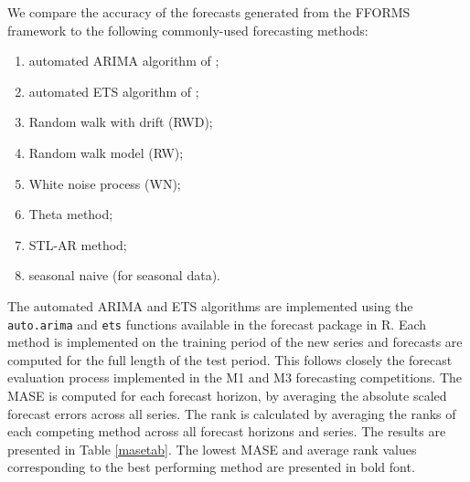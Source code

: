 \documentclass[11pt,a4paper,]{article}
\providecommand{\tightlist}{%
  \setlength{\itemsep}{0pt}\setlength{\parskip}{0pt}}
\theoremstyle{definition}
\theoremstyle{definition}
\theoremstyle{definition}
\theoremstyle{remark}
\begin{document}
We compare the accuracy of the forecasts generated from the FFORMS
framework to the following commonly-used forecasting methods:

\begin{enumerate}
\def\labelenumi{\arabic{enumi}.}
\tightlist
\item
  automated ARIMA algorithm of \textcite{Hyndman2008};
\item
  automated ETS algorithm of \textcite{Hyndman2008};
\item
  Random walk with drift (RWD);
\item
  Random walk model (RW);
\item
  White noise process (WN);
\item
  Theta method;
\item
  STL-AR method;
\item
  seasonal naive (for seasonal data).
\end{enumerate}

The automated ARIMA and ETS algorithms are implemented using the
\texttt{auto.arima} and \texttt{ets} functions available in the forecast
package in R. Each method is implemented on the training period of the
new series and forecasts are computed for the full length of the test
period. This follows closely the forecast evaluation process implemented
in the M1 and M3 forecasting competitions. The MASE is computed for each
forecast horizon, by averaging the absolute scaled forecast errors
across all series. The rank is calculated by averaging the ranks of each
competing method across all forecast horizons and series. The results
are presented in Table \ref{masetab}. The lowest MASE and average rank
values corresponding to the best performing method are presented in bold
font.
\end{document}
